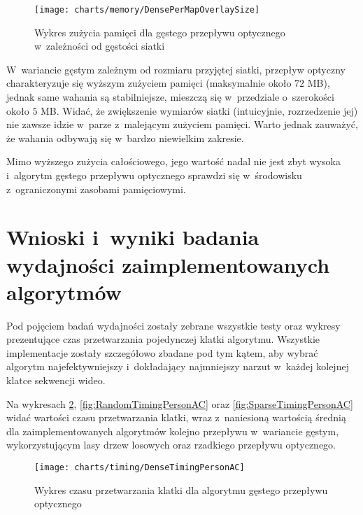     \begin{figure}[!ht]
      \centering
      \texttt{[image: charts/memory/DensePerMapOverlaySize]}
      \caption[Wykres zużycia pamięci dla gęstego przepływu optycznego w~zależności od gęstości siatki]
              {Wykres zużycia pamięci dla gęstego przepływu optycznego w~zależności od gęstości siatki}
      \label{fig:DenseOpticalFlowPerMapSize}
    \end{figure}

    \newpage

    W~wariancie gęstym zależnym od rozmiaru przyjętej siatki, przepływ optyczny charakteryzuje się wyższym zużyciem pamięci (maksymalnie około $72$ MB), jednak same wahania są stabilniejsze, mieszczą się w~przedziale o~szerokości około $5$ MB. Widać, że zwiększenie wymiarów siatki (intuicyjnie, rozrzedzenie jej) nie zawsze idzie w~parze z~malejącym zużyciem pamięci. Warto jednak zauważyć, że wahania odbywają się w~bardzo niewielkim zakresie.

    Mimo wyższego zużycia całościowego, jego wartość nadal nie jest zbyt wysoka i~algorytm gęstego przepływu optycznego sprawdzi się w~środowisku z~ograniczonymi zasobami pamięciowymi.

  \section{Wnioski i~wyniki badania wydajności zaimplementowanych algorytmów}\label{Section_Timing}

    Pod pojęciem badań wydajności zostały zebrane wszystkie testy oraz wykresy prezentujące czas przetwarzania pojedynczej klatki algorytmu. Wszystkie implementacje zostały szczegółowo zbadane pod tym kątem, aby wybrać algorytm najefektywniejszy i~dokładający najmniejszy narzut w~każdej kolejnej klatce sekwencji wideo.

    Na wykresach \ref{fig:DenseTimingPersonAC}, \ref{fig:RandomTimingPersonAC} oraz \ref{fig:SparseTimingPersonAC} widać wartości czasu przetwarzania klatki, wraz z~naniesioną wartością średnią dla zaimplementowanych algorytmów kolejno przepływu w~wariancie gęstym, wykorzystującym lasy drzew losowych oraz rzadkiego przepływu optycznego.

    \begin{figure}[!ht]
      \centering
      \texttt{[image: charts/timing/DenseTimingPersonAC]}
      \caption[Wykres czasu przetwarzania klatki dla algorytmu gęstego przepływu optycznego]
              {Wykres czasu przetwarzania klatki dla algorytmu gęstego przepływu optycznego}
      \label{fig:DenseTimingPersonAC}
    \end{figure}

